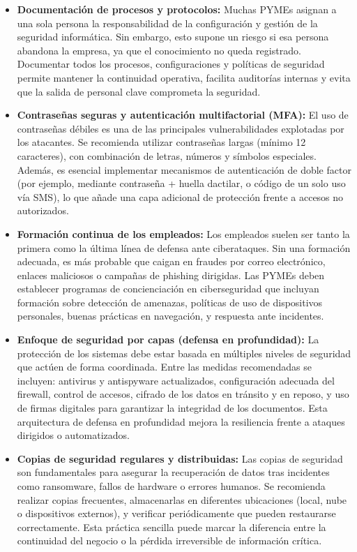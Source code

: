 \documentclass[a4paper, 10pt]{article}
\begin{document}
    \begin{itemize}
        
        \item \textbf{Documentación de procesos y protocolos:}  
        Muchas PYMEs asignan a una sola persona la responsabilidad de la configuración y gestión de la seguridad informática. Sin embargo, esto supone un riesgo si esa persona abandona la empresa, ya que el conocimiento no queda registrado. Documentar todos los procesos, configuraciones y políticas de seguridad permite mantener la continuidad operativa, facilita auditorías internas y evita que la salida de personal clave comprometa la seguridad.
    
        \item \textbf{Contraseñas seguras y autenticación multifactorial (MFA):}  
        El uso de contraseñas débiles es una de las principales vulnerabilidades explotadas por los atacantes. Se recomienda utilizar contraseñas largas (mínimo 12 caracteres), 
        con combinación de letras, números y símbolos especiales. Además, es esencial implementar mecanismos de autenticación de doble factor (por ejemplo, mediante contraseña + huella dactilar, o código de un solo uso vía SMS), lo que añade una capa adicional de protección frente a accesos no autorizados.
    
        \item \textbf{Formación continua de los empleados:}  
        Los empleados suelen ser tanto la primera como la última línea de defensa ante ciberataques. Sin una formación adecuada, es más probable que caigan en fraudes por correo electrónico, 
        enlaces maliciosos o campañas de phishing dirigidas. Las PYMEs deben establecer programas de concienciación en ciberseguridad que incluyan formación sobre detección de amenazas, políticas de uso de dispositivos personales, buenas prácticas en navegación, y respuesta ante incidentes.
    
        \item \textbf{Enfoque de seguridad por capas (defensa en profundidad):}  
        La protección de los sistemas debe estar basada en múltiples niveles de seguridad que actúen de forma coordinada. Entre las medidas recomendadas se incluyen: 
        antivirus y antispyware actualizados, configuración adecuada del firewall, control de accesos, cifrado de los datos en tránsito y en reposo, y uso de firmas digitales para garantizar la integridad de los documentos. Esta arquitectura de defensa en profundidad mejora la resiliencia frente a ataques dirigidos o automatizados.
    
        \item \textbf{Copias de seguridad regulares y distribuidas:}  
        Las copias de seguridad son fundamentales para asegurar la recuperación de datos tras incidentes como ransomware, fallos de hardware o errores humanos. Se recomienda realizar copias frecuentes, almacenarlas en diferentes ubicaciones (local, nube o dispositivos externos), y verificar periódicamente que pueden restaurarse correctamente. Esta práctica sencilla puede marcar la diferencia entre la continuidad del negocio o la pérdida irreversible de información crítica.
    
    \end{itemize}
    
\end{document}

